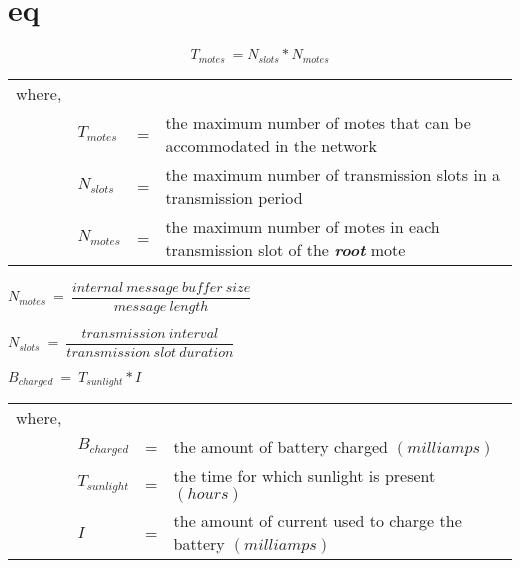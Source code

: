 \chapter{eq}

\begin{equation}
T_{motes}\ = N_{slots}*N_{motes} 
\end{equation}


\begin{tabular}{lllp{10cm}}
where, &   &   &   \\ 
  & $T_{motes}$  & = & the maximum number of motes that can be accommodated in the network \\ 
  & $N_{slots}$ & = & the maximum number of transmission slots in a transmission period \\ 
  & $N_{motes}$ & = & the maximum number of motes in each transmission slot of the \textit{\textbf{root}} mote \\ 
\end{tabular} 

\begin{center}
$N_{motes}\ =\ \dfrac{internal\ message\ buffer\ size}{message\ length}$
\end{center}


$N_{slots}\ =\ \dfrac{transmission\ interval}{transmission\ slot\ duration}$


$B_{charged}\ =\ T_{sunlight}*I$



\begin{tabular}{lllp{10cm}}
where, &   &   &   \\ 
  & $B_{charged}$  & = & the amount of battery charged $(milliamps)$ \\ 
  & $T_{sunlight}$ & = &  the time for which sunlight is present $(hours)$\\ 
  & $I$ & = & the amount of current used to charge the battery $(milliamps)$\\ 
\end{tabular} 